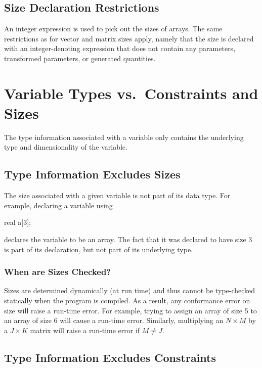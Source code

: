 \subsection{Size Declaration Restrictions}

An integer expression is used to pick out the sizes of arrays.  The
same restrictions as for vector and matrix sizes apply, namely that
the size is declared with an integer-denoting expression that does not
contain any parameters, transformed parameters, or generated quantities.




\section{Variable Types vs.\ Constraints and Sizes}

The type information associated with a variable only contains the
underlying type and dimensionality of the variable.

\subsection{Type Information Excludes Sizes}

The size associated with a given variable is not part of its data
type.  For example, declaring a variable using
\begin{stancode}
real a[3];
\end{stancode}
%
declares the variable  to be an array.  The fact that it was
declared to have size 3 is part of its declaration, but not part of
its underlying type.

\subsubsection{When are Sizes Checked?}

Sizes are determined dynamically (at run time) and thus cannot be
type-checked statically when the program is compiled.  As a result,
any conformance error on size will raise a run-time error.  For
example, trying to assign an array of size 5 to an array of size 6
will cause a run-time error.  Similarly, multiplying an $N
\times M$ by a $J \times K$ matrix will raise a run-time error if $M
\neq J$.

\subsection{Type Information Excludes Constraints}

